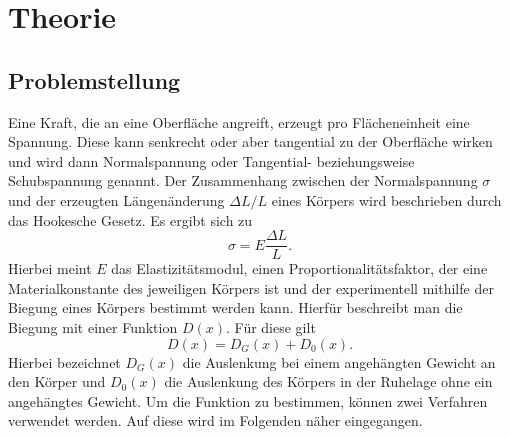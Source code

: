 \section{Theorie}
\label{sec:Theorie}
\subsection{Problemstellung}
\label{sec:problemstellung}
Eine Kraft, die an eine Oberfläche angreift, erzeugt pro Flächeneinheit eine Spannung.
Diese kann senkrecht oder aber tangential zu der Oberfläche wirken und wird dann
Normalspannung oder Tangential- beziehungsweise Schubspannung genannt.
Der Zusammenhang zwischen der Normalspannung $\sigma$ und
der erzeugten Längenänderung $\Delta L/L$ eines Körpers wird beschrieben durch das Hookesche Gesetz.
Es ergibt sich zu
\begin{equation}
  \sigma = E \frac{\Delta L}{L}.
  \label{eqn:captainhook}
\end{equation}
Hierbei meint $E$ das Elastizitätsmodul, einen Proportionalitätsfaktor, der eine
Materialkonstante des jeweiligen Körpers ist und der experimentell mithilfe der
Biegung eines Körpers bestimmt werden kann.
Hierfür beschreibt man die Biegung mit einer Funktion $D(x)$. Für diese gilt
\begin{equation}
  D(x) = D_G(x) + D_0(x).
  \label{eqn:DmitNull}
\end{equation}
Hierbei bezeichnet $D_G(x)$ die Auslenkung bei einem angehängten Gewicht an den Körper
und $D_0(x)$ die Auslenkung des Körpers in der Ruhelage ohne ein angehängtes Gewicht.
Um die Funktion zu bestimmen, können zwei Verfahren verwendet werden. Auf diese
wird im Folgenden näher eingegangen.

